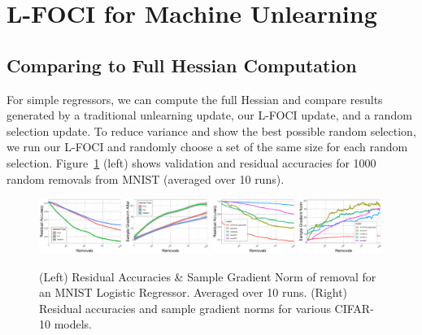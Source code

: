\section{L-FOCI for Machine Unlearning}

\subsection{Comparing to Full Hessian Computation}
For simple regressors, we can compute the full Hessian and compare results generated by a traditional unlearning update, our L-FOCI update, and a random selection update. To reduce variance and show the best possible random selection, we run our L-FOCI and randomly choose a set of the same size for each random selection. Figure~\ref{fig:mnistcifar} (left) shows validation and residual accuracies for 1000 random removals from MNIST (averaged over 10 runs). 

\begin{figure}
    \centering
    \includegraphics[width=0.24\textwidth]{5_unlearn/figs/scrub/MNIST_Resid_Acc.png}
     \includegraphics[width=0.24\textwidth]{5_unlearn/figs/scrub/MNIST_GradNorm_Logistic.png}
    \includegraphics[width=0.24\textwidth]{5_unlearn/figs/scrub/cifar_resid.png}
    \includegraphics[width=0.24\textwidth]{5_unlearn/figs/scrub/CIFAR_gradnom.png}
    \caption[Residual accuracies and gradient norms]{(Left) Residual Accuracies \& Sample Gradient Norm of removal for an MNIST Logistic Regressor. Averaged over 10 runs. (Right) Residual accuracies and sample gradient norms for various CIFAR-10 models.}
    \label{fig:mnistcifar}
\end{figure}


